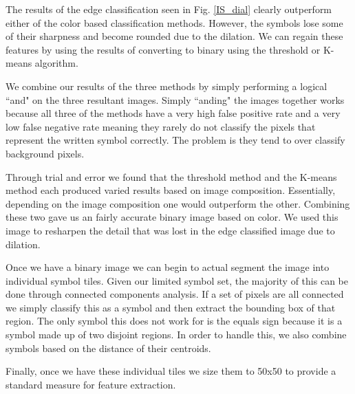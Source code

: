 
The results of the edge classification seen in Fig. \ref{IS_dial} clearly outperform either of the color based classification methods. However, the symbols lose some of their sharpness and become rounded due to the dilation. We can regain these features by using the results of converting to binary using the threshold or K-means algorithm.

We combine our results of the three methods by simply performing a logical ``and" on the three resultant images. Simply ``anding" the images together works because all three of the methods have a very high false positive rate and a very low false negative rate meaning they rarely do not classify the pixels that represent the written symbol correctly. The problem is they tend to over classify background pixels.


Through trial and error we found that the threshold method and the K-means method each produced varied results based on image composition. Essentially, depending on the image composition one would outperform the other. Combining these two gave us an fairly accurate binary image based on color. We used this image to resharpen the detail that was lost in the edge classified image due to dilation.

Once we have a binary image we can begin to actual segment the image into individual symbol tiles. Given our limited symbol set, the majority of this can be done through connected components analysis. If a set of pixels are all connected we simply classify this as a symbol and then extract the bounding box of that region. The only symbol this does not work for is the equals sign because it is a symbol made up of two disjoint regions. In order to handle this, we also combine symbols based on the distance of their centroids.

Finally, once we have these individual tiles we size them to 50x50 to provide a standard measure for feature extraction.  


